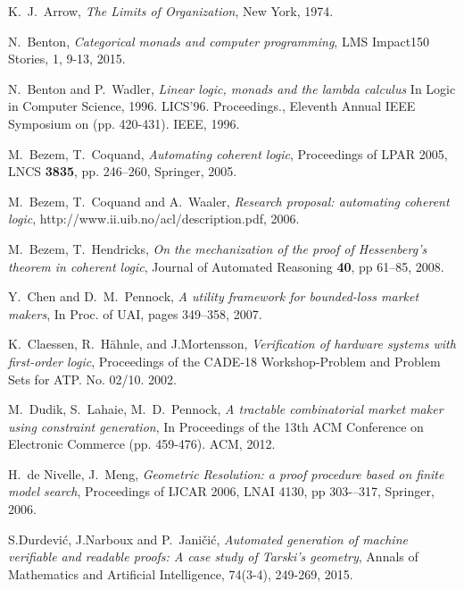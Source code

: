\documentclass[english,letter paper,12pt,reqno]{article}
\theoremstyle{example}
\begin{document}

\providecommand{\bysame}{\leavevmode\hbox to3em{\hrulefill}\thinspace}
\providecommand{\href}[2]{#2}
\begin{thebibliography}{BHLS03}

K.~J.~Arrow, \textsl{The Limits of Organization}, New York, 1974.

N.~Benton, \textsl{Categorical monads and computer programming}, LMS Impact150 Stories, 1, 9-13, 2015. 

N.~Benton and P.~Wadler, \textsl{Linear logic, monads and the lambda calculus} In Logic in Computer Science, 1996. LICS'96. Proceedings., Eleventh Annual IEEE Symposium on (pp. 420-431). IEEE, 1996. 

M.~Bezem, T.~Coquand, \textsl{Automating coherent logic}, Proceedings of LPAR 2005, LNCS \textbf{3835}, pp. 246--260, Springer, 2005.

M.~Bezem, T.~Coquand and A.~Waaler, \textsl{Research proposal: automating coherent logic}, \href{http://www.ii.uib.no/acl/description.pdf}{http://www.ii.uib.no/acl/description.pdf}, 2006.

M.~Bezem, T.~Hendricks, \textsl{On the mechanization of the proof of Hessenberg’s theorem in coherent logic}, Journal of Automated Reasoning \textbf{40}, pp 61--85, 2008.

Y.~Chen and D.~M.~Pennock, \textsl{A utility framework for bounded-loss market makers}, In Proc. of UAI, pages 349–358, 2007.

K.~Claessen, R.~H\"ahnle, and J.Mortensson, \textsl{Verification of hardware systems with first-order logic}, Proceedings of the CADE-18 Workshop-Problem and Problem Sets for ATP. No. 02/10. 2002.

M.~Dudik, S.~Lahaie, M.~D.~Pennock, \textsl{A tractable combinatorial market maker using constraint generation}, In Proceedings of the 13th ACM Conference on Electronic Commerce (pp. 459-476). ACM, 2012.

H.~de Nivelle, J.~Meng, \textsl{Geometric Resolution: a proof procedure based on finite model search}, Proceedings of IJCAR 2006, LNAI 4130, pp 303-–317, Springer, 2006.

S.Durdevi\'c, J.Narboux and P.~Jani\v{c}i\'{c}, \textsl{Automated generation of machine verifiable and readable proofs: A case study of Tarski’s geometry}, Annals of Mathematics and Artificial Intelligence, 74(3-4), 249-269, 2015.


\end{thebibliography}
\end{document}
